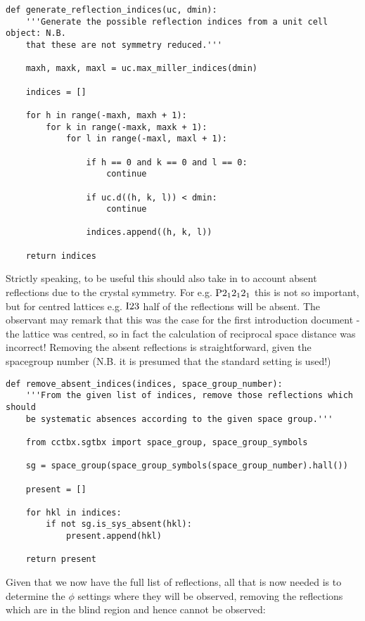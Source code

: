\documentclass[a4paper, 11pt]{article}
\begin{document}
{\small
\begin{verbatim}
def generate_reflection_indices(uc, dmin):
    '''Generate the possible reflection indices from a unit cell object: N.B.
    that these are not symmetry reduced.'''

    maxh, maxk, maxl = uc.max_miller_indices(dmin)

    indices = []

    for h in range(-maxh, maxh + 1):
        for k in range(-maxk, maxk + 1):
            for l in range(-maxl, maxl + 1):

                if h == 0 and k == 0 and l == 0:
                    continue

                if uc.d((h, k, l)) < dmin:
                    continue

                indices.append((h, k, l))

    return indices 
\end{verbatim}
}

Strictly speaking, to be useful this should also take in to account absent reflections due to the crystal symmetry. For e.g. $\rm{P} 2_1 2_1 2_1$ this is not so important, but for centred lattices e.g. $\rm{I} 2 3$ half of the reflections will be absent. The observant may remark that this was the case for the first introduction document - the lattice was centred, so in fact the calculation of reciprocal space distance was incorrect! Removing the absent reflections is straightforward, given the spacegroup number (N.B. it is presumed that the standard setting is used!)

{\small
\begin{verbatim}
def remove_absent_indices(indices, space_group_number):
    '''From the given list of indices, remove those reflections which should
    be systematic absences according to the given space group.'''

    from cctbx.sgtbx import space_group, space_group_symbols

    sg = space_group(space_group_symbols(space_group_number).hall())

    present = []

    for hkl in indices:
        if not sg.is_sys_absent(hkl):
            present.append(hkl)

    return present
\end{verbatim}
}

Given that we now have the full list of reflections, all that is now needed is to determine the $\phi$ settings where they will be observed, removing the reflections which are in the blind region and hence cannot be observed:
\end{document}

